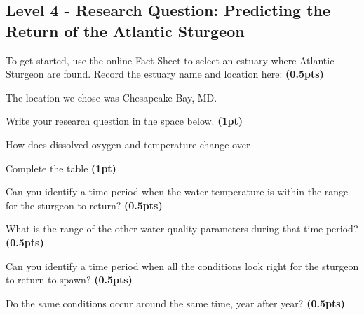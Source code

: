 \documentclass[12pt,letterpaper]{article}
\begin{document}
\subsection*{Level 4 - Research Question: Predicting the Return of the Atlantic Sturgeon}
\begin{enumerate}[font=\bfseries, wide, resume]
    {\color{under}\item To get started, use the online Fact Sheet to select an estuary where Atlantic Sturgeon are found. Record the estuary name and location here:  \textbf{(0.5pts)}  }

    The location we chose was Chesapeake Bay, MD. 

    {\color{under}\item Write your research question in the space below. \textbf{(1pt)} }

    How does dissolved oxygen and temperature change over 

    {\color{under}\item Complete the table \textbf{(1pt)}}
    {\color{under}\item Can you identify a time period when the water temperature is within the range for the sturgeon to return? \textbf{(0.5pts)}}
    {\color{under}\item What is the range of the other water quality parameters during that time period? \textbf{(0.5pts)}}
    {\color{under}\item Can you identify a time period when all the conditions look right for the sturgeon to return to spawn? \textbf{(0.5pts)}}
    {\color{under}\item Do the same conditions occur around the same time, year after year? \textbf{(0.5pts)}}
\end{enumerate}
\end{document}
